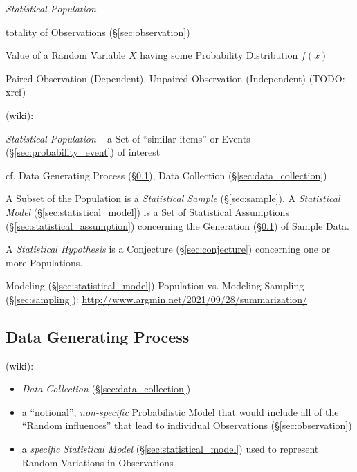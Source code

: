 \emph{Statistical Population}

totality of Observations (\S\ref{sec:observation})

Value of a Random Variable $X$ having some Probability Distribution $f(x)$

Paired Observation (Dependent), Unpaired Observation (Independent) (TODO: xref)

(wiki):

\emph{Statistical Population} -- a Set of ``similar items'' or Events
(\S\ref{sec:probability_event}) of interest

\fist cf. Data Generating Process (\S\ref{sec:data_generating_process}), Data
Collection (\S\ref{sec:data_collection})

A Subset of the Population is a \emph{Statistical Sample} (\S\ref{sec:sample}).
A \emph{Statistical Model} (\S\ref{sec:statistical_model}) is a Set of
Statistical Assumptions (\S\ref{sec:statistical_assumption}) concerning the
Generation (\S\ref{sec:data_generating_process}) of Sample Data.

A \emph{Statistical Hypothesis} is a Conjecture (\S\ref{sec:conjecture})
concerning one or more Populations.

\fist Modeling (\S\ref{sec:statistical_model}) Population vs. Modeling Sampling
(\S\ref{sec:sampling}): \url{http://www.argmin.net/2021/09/28/summarization/}



\subsection{Data Generating Process}\label{sec:data_generating_process}

(wiki):

\begin{itemize}
  \item \emph{Data Collection} (\S\ref{sec:data_collection})
  \item a ``notional'', \emph{non-specific} Probabilistic Model
    that would include all of the ``Random influences'' that lead to individual
    Observations (\S\ref{sec:observation})
  \item a \emph{specific} \emph{Statistical Model}
    (\S\ref{sec:statistical_model}) used to represent Random Variations in
    Observations
\end{itemize}

